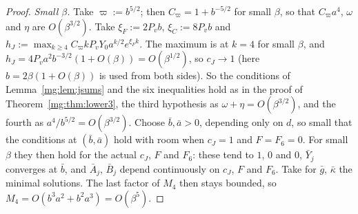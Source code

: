 \documentclass[11pt,a4paper]{article}
\theoremstyle{definition}
\theoremstyle{remark}
\begin{document}
\begin{proof}
\emph{Small $\beta$.} Take $\varpi:=b^{5/2}$; then $C_\varpi=1+b^{-5/2}$ for small $\beta$, so that $C_\varpi a^4$, $\omega$ and $\eta$ are $O(\beta^{3/2})$. Take $\xi_F:=2P_vb$,
$\xi_C:=8P_vb$ and $h_J:=\max_{k\ge4}C_\varpi kP_vY_0a^{k/2}e^{\xi_Fk}$. The maximum is at $k=4$ for small $\beta$, and $h_J=4P_va^2b^{-3/2}(1+O(\beta))=O(\beta^{1/2})$, so
$c_J\to1$ (here $b=2\beta(1+O(\beta))$ is used from both sides). So the conditions of Lemma~\ref{mg:lem:jsums} and the six inequalities hold as in the proof of
Theorem~\ref{mg:thm:lower3}, the third hypothesis as $\omega+\eta=O(\beta^{3/2})$, and the fourth as $a^4/b^{5/2}=O(\beta^{3/2})$. Choose $\bar b,\bar a>0$, depending only on $d$,
so small that the conditions at $(\bar b,\bar a)$ hold with room when $c_J=1$ and $F=F_6=0$. For small $\beta$ they then hold for the actual $c_J$, $F$ and $F_6$: these
tend to $1$, $0$ and $0$, $\bar Y_j$ converges at $\bar b$, and $\bar A_j$, $\bar B_j$ depend continuously on $c_J$, $F$ and $F_6$. Take for $\bar g$, $\bar\kappa$ the minimal
solutions. The last factor of $M_4$ then stays bounded, so $M_4=O(b^3a^2+b^2a^3)=O(\beta^5)$.


\end{proof}
\end{document}
